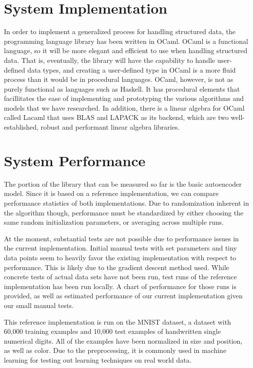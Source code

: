 \documentclass{sig-alternate}
\begin{document}
\section{System Implementation}
\label{sec:sysimp}

In order to implement a generalized process for handling structured data, the programming language 
library has been written in OCaml. OCaml is a functional language, so it will be more elegant and 
efficient to use when handling structured data. That is, eventually, the library will have the 
capability to handle user-defined data types, and creating a user-defined type in OCaml is a more
fluid process than it would be in procedural languages. OCaml, however, is not as purely functional 
as languages such as Haskell. It has procedural elements that facillitates the ease of implementing and prototyping the various algorithms and models that we have researched. In addition, there is a 
linear algebra for OCaml called Lacaml that uses BLAS and LAPACK as its backend, which are two
well-established, robust and performant linear algebra libraries.


\section{System Performance}
\label{sec:sysperformance}

The portion of the library that can be measured so far is the basic autoencoder model. 
Since it is based on a reference implementation, we can compare performance statistics of both
implementations. Due to randomization inherent in the algorithm though, performance must be
standardized by either choosing the same random initialization parameters, or averaging 
across multiple runs. 

At the moment, substantial tests are not possible due to performance issues in the current 
implementation. Initial
manual tests with set parameters and tiny data points seem to heavily favor the existing 
implementation with respect to performance. This is likely due to the gradient descent
method used. While concrete 
tests of actual data sets have not 
been run, test runs of the reference implementation has been run locally. A chart of
performance for those runs is provided, as well as estimated performance of our current 
implementation given our small manual tests. 

This reference implementation is run on the MNIST dataset, a dataset with 60,000 training examples
and 10,000 test examples of handwritten single numerical digits. All of the examples have 
been normalized in size and position, as well as color. Due to the preprocessing, 
it is commonly used in machine learning for testing out learning techniques on real world data. 
\end{document}
